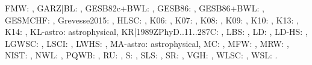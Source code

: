 \documentclass[fleqn,usenatbib,useAMS]{mnras}
\begin{document}
\begin{table}
{FMW: \cite{FMW},  GARZ|BL: \cite{GARZ,BL},  GESB82c+BWL: \cite{GESB82c,BWL},  GESB86: \cite{GESB86},  GESB86+BWL: \cite{GESB86,BWL},  GESMCHF: \cite{GESMCHF},  Grevesse2015: \cite{Grevesse2015},  HLSC: \cite{HLSC}, 
K06: \cite{K06},  K07: \cite{K07},  K08: \cite{K08},  K09: \cite{K09},  K10: \cite{K10},  K13: \cite{K13},  K14: \cite{K14},  KL-astro: astrophysical,  KR|1989ZPhyD..11..287C: \cite{KR,1989ZPhyD..11..287C}, 
LBS: \cite{LBS},  LD: \cite{LD},  LD-HS: \cite{LD-HS},  LGWSC: \cite{LGWSC},  LSCI: \cite{LSCI},  LWHS: \cite{LWHS},  MA-astro: astrophysical,  MC: \cite{MC},  MFW: \cite{MFW},  MRW: \cite{MRW},  NIST: \cite{NIST10}, 
NWL: \cite{NWL},  PQWB: \cite{PQWB},  RU: \cite{RU},  S: \cite{S},  SLS: \cite{SLS},  SR: \cite{SR},  VGH: \cite{VGH},  WLSC: \cite{WLSC},  WSL: \cite{WSL}.
}
\end{table}








\bsp	%
\label{lastpage}
\end{document}
